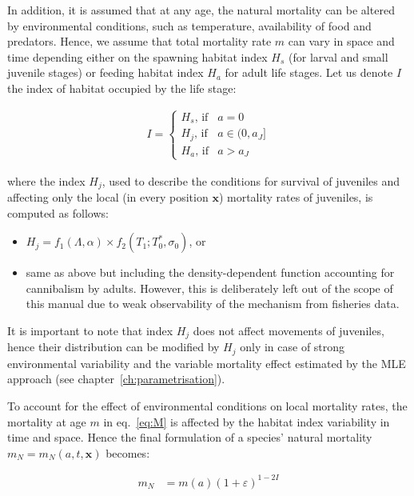 In addition, it is assumed that at any age, the natural mortality can be altered by environmental conditions, such as temperature, availability of food and predators. Hence, we assume that total mortality rate $m$ can vary in space and time depending either on the spawning habitat index $H_s$ (for larval and small juvenile stages) or feeding habitat index $H_a$ for adult life stages. Let us denote $I$ the index of habitat occupied by the life stage:

\begin{eqnarray}
 I = \left\{
 \begin{array}{cl}
	H_s\text{, if}& a=0\\
	H_j\text{, if}& a \in (0,a_J]  \\
	H_a\text{, if}& a>a_J
  \end{array} 
  \right.
\label{eq:H-in-M}  
\end{eqnarray}

\noindent where the index $H_j$, used to describe the conditions for survival of juveniles and affecting only the local (in every position $\mathbf{x}$) mortality rates of juveniles, is computed as follows:

\begin{itemize}
\item $H_j=f_1(\Lambda,\alpha) \times f_2(T_1;T^*_0,\sigma_0)$, or
\item same as above but including the density-dependent function accounting for cannibalism by adults. However, this is deliberately left out of the scope of this manual due to weak observability of the mechanism from fisheries data. 
\end{itemize}

\noindent It is important to note that index $H_j$ does not affect movements of juveniles, hence their distribution can be modified by $H_j$ only in case of strong environmental variability and the variable mortality effect estimated by the MLE approach (see chapter~\ref{ch:parametrisation}). 

To account for the effect of environmental conditions on local mortality rates, the mortality at age $m$ in eq.~\ref{eq:M} is affected by the habitat index variability in time and space. Hence the final formulation of a species' natural mortality $m_N=m_N(a,t,\mathbf{x})$ becomes:

	\begin{align}
	m_N & = m(a)(1+\varepsilon)^{1-2I}
	\label{eq:Mvar}
	\end{align}
	
